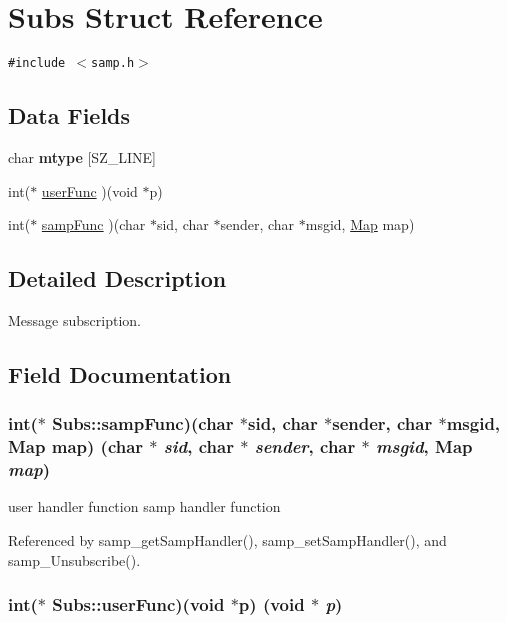 \hypertarget{structSubs}{
\section{Subs Struct Reference}
\label{structSubs}
}
{\tt \#include $<$samp.h$>$}

\subsection*{Data Fields}
\begin{CompactItemize}
\item 
\hypertarget{structSubs_e34561f0e9c8805dcb19fe4f91ea3e3e}{
char \textbf{mtype} \mbox{[}SZ\_\-LINE\mbox{]}}
\label{structSubs_e34561f0e9c8805dcb19fe4f91ea3e3e}

\item 
int($\ast$ \hyperlink{structSubs_14364d5a161adc47732c39b96e8156f0}{userFunc} )(void $\ast$p)
\item 
int($\ast$ \hyperlink{structSubs_c4eca724f23609bb7ab9640c39c1001b}{sampFunc} )(char $\ast$sid, char $\ast$sender, char $\ast$msgid, \hyperlink{sampDecl_8h_39a90bc041db57e1a6ba736ba91eee30}{Map} map)
\end{CompactItemize}


\subsection{Detailed Description}
Message subscription. 

\subsection{Field Documentation}
\hypertarget{structSubs_c4eca724f23609bb7ab9640c39c1001b}{
\subsubsection[{sampFunc}]{\setlength{\rightskip}{0pt plus 5cm}int($\ast$ {\bf Subs::sampFunc})(char $\ast$sid, char $\ast$sender, char $\ast$msgid, {\bf Map} map) (char $\ast$ {\em sid}, \/  char $\ast$ {\em sender}, \/  char $\ast$ {\em msgid}, \/  {\bf Map} {\em map})}}
\label{structSubs_c4eca724f23609bb7ab9640c39c1001b}


user handler function samp handler function 

Referenced by samp\_\-getSampHandler(), samp\_\-setSampHandler(), and samp\_\-Unsubscribe().\hypertarget{structSubs_14364d5a161adc47732c39b96e8156f0}{
\subsubsection[{userFunc}]{\setlength{\rightskip}{0pt plus 5cm}int($\ast$ {\bf Subs::userFunc})(void $\ast$p) (void $\ast$ {\em p})}}
\label{structSubs_14364d5a161adc47732c39b96e8156f0}


